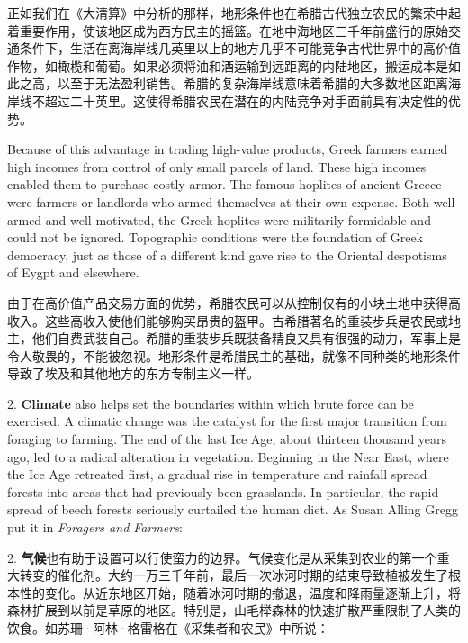 \begin{Parallel}{97mm}{72mm}
  \ParallelRText
  {正如我们在《大清算》中分析的那样，地形条件也在希腊古代独立农民的繁荣中起着重要作用，使该地区成为西方民主的摇篮。在地中海地区三千年前盛行的原始交通条件下，生活在离海岸线几英里以上的地方几乎不可能竞争古代世界中的高价值作物，如橄榄和葡萄。如果必须将油和酒运输到远距离的内陆地区，搬运成本是如此之高，以至于无法盈利销售。希腊的复杂海岸线意味着希腊的大多数地区距离海岸线不超过二十英里。这使得希腊农民在潜在的内陆竞争对手面前具有决定性的优势。}
  \ParallelPar


  \ParallelLText
  {Because of this advantage in trading high-value products, Greek farmers earned high incomes from control of only small parcels of land. These high incomes enabled them to purchase costly armor. The famous hoplites of ancient Greece were farmers or landlords who armed themselves at their own expense. Both well armed and well motivated, the Greek hoplites were militarily formidable and could not be ignored. Topographic conditions were the foundation of Greek democracy, just as those of a different kind gave rise to the Oriental despotisms of Eygpt and elsewhere.}
  
  \ParallelRText
  {由于在高价值产品交易方面的优势，希腊农民可以从控制仅有的小块土地中获得高收入。这些高收入使他们能够购买昂贵的盔甲。古希腊著名的重装步兵是农民或地主，他们自费武装自己。希腊的重装步兵既装备精良又具有很强的动力，军事上是令人敬畏的，不能被忽视。地形条件是希腊民主的基础，就像不同种类的地形条件导致了埃及和其他地方的东方专制主义一样。}
  \ParallelPar


  \ParallelLText
  {2. \textbf{Climate} also helps set the boundaries within which brute force can be exercised. A climatic change was the catalyst for the first major transition from foraging to farming. The end of the last Ice Age, about thirteen thousand years ago, led to a radical alteration in vegetation. Beginning in the Near East, where the Ice Age retreated first, a gradual rise in temperature and rainfall spread forests into areas that had previously been grasslands. In particular, the rapid spread of beech forests seriously curtailed the human diet. As Susan Alling Gregg put it in \emph{Foragers and Farmers}:}
  
  \ParallelRText
  {2. \textbf{气候}也有助于设置可以行使蛮力的边界。气候变化是从采集到农业的第一个重大转变的催化剂。大约一万三千年前，最后一次冰河时期的结束导致植被发生了根本性的变化。从近东地区开始，随着冰河时期的撤退，温度和降雨量逐渐上升，将森林扩展到以前是草原的地区。特别是，山毛榉森林的快速扩散严重限制了人类的饮食。如苏珊·阿林·格雷格在《采集者和农民》中所说：}
  \ParallelPar



\end{Parallel}

